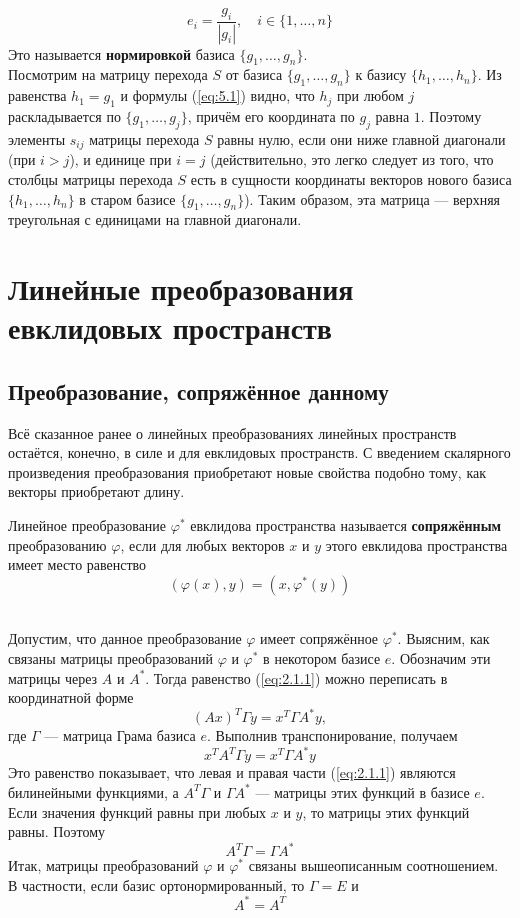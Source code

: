 \documentclass[11pt]{article}
\begin{document}
\[e_i = \frac{g_i}{\left\lvert g_i \right\rvert}, \quad i \in \{1, \ldots, n\}\]
Это называется \textbf{нормировкой} базиса $\{g_1, \ldots, g_n\}$. \\
Посмотрим на матрицу перехода $S$ от базиса $\{g_1, \ldots, g_n\}$ к базису $\{h_1, \ldots, h_n\}$. Из равенства $h_1 = g_1$ и формулы (\ref{eq:5.1}) видно, что $h_j$ при любом $j$ раскладывается по $\{g_1, \ldots, g_j\}$, причём его координата по $g_j$ равна $1$. Поэтому элементы $s_{ij}$ матрицы перехода $S$ равны нулю, если они ниже главной диагонали (при $i > j$), и единице при $i = j$ (действительно, это легко следует из того, что столбцы матрицы перехода $S$ есть в сущности координаты векторов нового базиса $\{h_1, \ldots, h_n\}$ в старом базисе $\{g_1, \ldots, g_n\}$). Таким образом, эта матрица --- верхняя треугольная с единицами на главной диагонали.

\section{Линейные преобразования евклидовых пространств}

\subsection{Преобразование, сопряжённое данному}

Всё сказанное ранее о линейных преобразованиях линейных пространств остаётся, конечно, в силе и для евклидовых пространств. С введением скалярного произведения преобразования приобретают новые свойства подобно тому, как векторы приобретают длину.

\begin{definition}
    Линейное преобразование $\varphi^{\ast}$ евклидова пространства называется \textbf{сопряжённым} преобразованию $\varphi$, если для любых векторов $x$ и $y$ этого евклидова пространства имеет место равенство
    \begin{equation} \label{eq:2.1.1}
        \left(\varphi(x), y\right) = \left(x, \varphi^{\ast} (y)\right)
    \end{equation}
\end{definition} \leavevmode
\\
Допустим, что данное преобразование $\varphi$ имеет сопряжённое $\varphi^{\ast}$. Выясним, как связаны матрицы преобразований $\varphi$ и $\varphi^{\ast}$ в некотором базисе $e$. Обозначим эти матрицы через $A$ и $A^{\ast}$. Тогда равенство (\ref{eq:2.1.1}) можно переписать в координатной форме 
\[(Ax)^T \Gamma y = x^T \Gamma A^{\ast} y,\]
где $\Gamma$ --- матрица Грама базиса $e$. Выполнив транспонирование, получаем
\[x^T A^T \Gamma y = x^T \Gamma A^{\ast} y\]
Это равенство показывает, что левая и правая части (\ref{eq:2.1.1}) являются билинейными функциями, а $A^T \Gamma$ и $\Gamma A^{\ast}$ --- матрицы этих функций в базисе $e$. Если значения функций равны при любых $x$ и $y$, то матрицы этих функций равны. Поэтому
\[A^T \Gamma = \Gamma A^{\ast}\]
Итак, матрицы преобразований $\varphi$ и $\varphi^{\ast}$ связаны вышеописанным соотношением. В частности, если базис ортонормированный, то $\Gamma = E$ и
\begin{equation} \label{eq:2.1.2}
    A^{\ast} = A^T
\end{equation}
\end{document}
